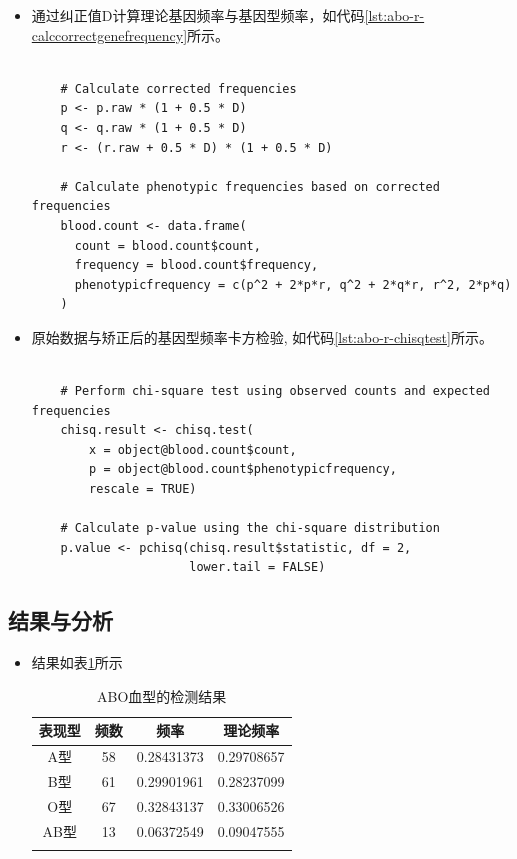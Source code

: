 \documentclass[AutoFakeBold]{LZUThesis}
\begin{document}
\begin{enumerate}
\begin{itemize}
\begin{lstlisting}[caption={计算理论基因频率}, label={lst:abo-r-calcgenefrequency}, style=myRstyle]
    # Calculate uncorrected frequencies and correction factor D
    p.raw <- 1 - sqrt(blood.count["A", 2] + blood.count["O", 2])
    q.raw <- 1 - sqrt(blood.count["B", 2] + blood.count["O", 2])
    r.raw <- sqrt(blood.count["O", 2])
    D <- 1 - p.raw - q.raw - r.raw
    \end{lstlisting}
    \item 通过纠正值D计算理论基因频率与基因型频率，如代码\ref{lst:abo-r-calccorrectgenefrequency}所示。
    \begin{lstlisting}[caption={通过纠正值D计算矫正理论基因频率}, label={lst:abo-r-calccorrectgenefrequency}, style=myRstyle]

    # Calculate corrected frequencies
    p <- p.raw * (1 + 0.5 * D)
    q <- q.raw * (1 + 0.5 * D)
    r <- (r.raw + 0.5 * D) * (1 + 0.5 * D)

    # Calculate phenotypic frequencies based on corrected frequencies
    blood.count <- data.frame(
      count = blood.count$count,
      frequency = blood.count$frequency,
      phenotypicfrequency = c(p^2 + 2*p*r, q^2 + 2*q*r, r^2, 2*p*q)
    )
    \end{lstlisting}
    \item 原始数据与矫正后的基因型频率卡方检验, 如代码\ref{lst:abo-r-chisqtest}所示。
    \begin{lstlisting}[caption={原始数据与矫正后的基因型频率卡方检验}, label={lst:abo-r-chisqtest}, style=myRstyle]

    # Perform chi-square test using observed counts and expected frequencies
    chisq.result <- chisq.test(
        x = object@blood.count$count,
        p = object@blood.count$phenotypicfrequency,
        rescale = TRUE)

    # Calculate p-value using the chi-square distribution
    p.value <- pchisq(chisq.result$statistic, df = 2,
                      lower.tail = FALSE)
    \end{lstlisting}
\end{itemize}
\subsection{结果与分析}
\begin{itemize}
    \item 结果如表\ref{tbl:ABOresult}所示
    \begin{longtable}{cccc}
        \toprule
        表现型 & 频数 & 频率 & 理论频率 \\
        \midrule
        A型 & 58 & 0.28431373 & 0.29708657 \\
        B型 & 61 & 0.29901961 & 0.28237099 \\
        O型 & 67 & 0.32843137 & 0.33006526 \\
        AB型 & 13 & 0.06372549 & 0.09047555 \\
        \bottomrule
        \caption{ABO血型的检测结果}
        \label{tbl:ABOresult}
    \end{longtable}


\end{itemize}
\end{enumerate}
\end{document}
